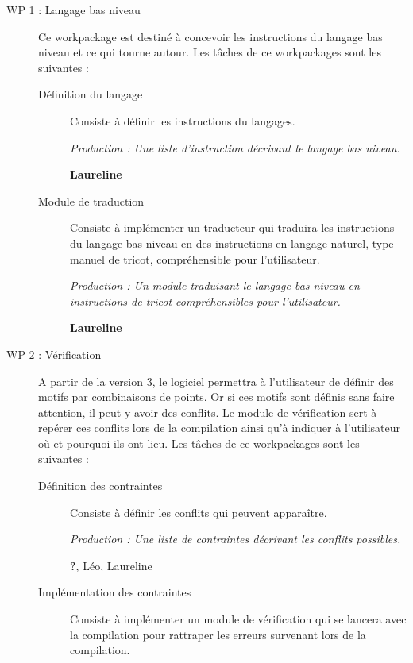 \documentclass{article}
\begin{document}
\begin{description}
\item[WP 1 : Langage bas niveau] Ce workpackage est destiné à concevoir les instructions du langage bas niveau et ce qui tourne autour. Les tâches de ce workpackages sont les suivantes :

    \begin{description}
    \item[Définition du langage] Consiste à définir les instructions du langages.

      \textit{Production : Une liste d'instruction décrivant le langage bas niveau.}

      \textbf{Laureline}

    \item[Module de traduction] Consiste à implémenter un traducteur qui traduira les instructions du langage bas-niveau en des instructions en langage naturel, type manuel de tricot, compréhensible pour l'utilisateur.

      \textit{Production : Un module traduisant le langage bas niveau en instructions de tricot compréhensibles pour l'utilisateur.}

      \textbf{Laureline}
    \end{description}

\medskip

\item[WP 2 : Vérification] A partir de la version 3, le logiciel permettra à l'utilisateur de définir des motifs par combinaisons de points. Or si ces motifs sont définis sans faire attention, il peut y avoir des conflits. Le module de vérification sert à repérer ces conflits lors de la compilation ainsi qu'à indiquer à l'utilisateur où et pourquoi ils ont lieu. Les tâches de ce workpackages sont les suivantes :

    \begin{description}
    \item[Définition des contraintes] Consiste à définir les conflits qui peuvent apparaître.
      
      \textit{Production : Une liste de contraintes décrivant les conflits possibles.}

      \textbf{?}, Léo, Laureline

    \item[Implémentation des contraintes] Consiste à implémenter un module de vérification qui se lancera avec la compilation pour rattraper les erreurs survenant lors de la compilation.
      

\end{description}
\end{description}
\end{document}
